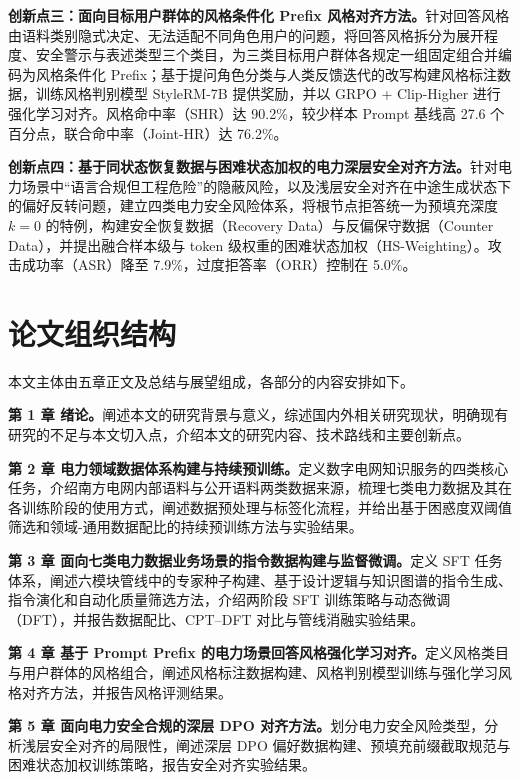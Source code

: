 \documentclass[fontset=fandol,type=master,campus=shenzhen,etitleauto=true]{hithesisbook}
\begin{document}
\textbf{创新点三：面向目标用户群体的风格条件化 Prefix 风格对齐方法。}针对回答风格由语料类别隐式决定、无法适配不同角色用户的问题，将回答风格拆分为展开程度、安全警示与表述类型三个类目，为三类目标用户群体各规定一组固定组合并编码为风格条件化 Prefix；基于提问角色分类与人类反馈迭代的改写构建风格标注数据，训练风格判别模型 StyleRM-7B 提供奖励，并以 GRPO + Clip-Higher 进行强化学习对齐。风格命中率（SHR）达 90.2\%，较少样本 Prompt 基线高 27.6 个百分点，联合命中率（Joint-HR）达 76.2\%。

\textbf{创新点四：基于同状态恢复数据与困难状态加权的电力深层安全对齐方法。}针对电力场景中“语言合规但工程危险”的隐蔽风险，以及浅层安全对齐在中途生成状态下的偏好反转问题，建立四类电力安全风险体系，将根节点拒答统一为预填充深度 $k=0$ 的特例，构建安全恢复数据（Recovery Data）与反偏保守数据（Counter Data），并提出融合样本级与 token 级权重的困难状态加权（HS-Weighting）。攻击成功率（ASR）降至 7.9\%，过度拒答率（ORR）控制在 5.0\%。

\section{论文组织结构}\label{ux8bbaux6587ux7ec4ux7ec7ux7ed3ux6784}

本文主体由五章正文及总结与展望组成，各部分的内容安排如下。

\textbf{第 1 章 绪论。}阐述本文的研究背景与意义，综述国内外相关研究现状，明确现有研究的不足与本文切入点，介绍本文的研究内容、技术路线和主要创新点。

\textbf{第 2 章 电力领域数据体系构建与持续预训练。}定义数字电网知识服务的四类核心任务，介绍南方电网内部语料与公开语料两类数据来源，梳理七类电力数据及其在各训练阶段的使用方式，阐述数据预处理与标签化流程，并给出基于困惑度双阈值筛选和领域-通用数据配比的持续预训练方法与实验结果。

\textbf{第 3 章 面向七类电力数据业务场景的指令数据构建与监督微调。}定义 SFT 任务体系，阐述六模块管线中的专家种子构建、基于设计逻辑与知识图谱的指令生成、指令演化和自动化质量筛选方法，介绍两阶段 SFT 训练策略与动态微调（DFT），并报告数据配比、CPT--DFT 对比与管线消融实验结果。

\textbf{第 4 章 基于 Prompt Prefix 的电力场景回答风格强化学习对齐。}定义风格类目与用户群体的风格组合，阐述风格标注数据构建、风格判别模型训练与强化学习风格对齐方法，并报告风格评测结果。

\textbf{第 5 章 面向电力安全合规的深层 DPO 对齐方法。}划分电力安全风险类型，分析浅层安全对齐的局限性，阐述深层 DPO 偏好数据构建、预填充前缀截取规范与困难状态加权训练策略，报告安全对齐实验结果。
\end{document}
